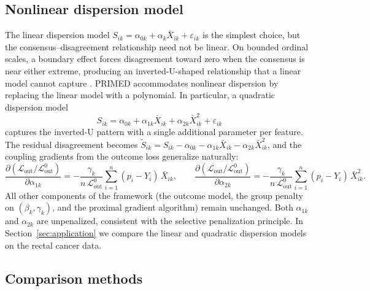 \documentclass[referee,lineno,pdflatex,sn-vancouver-num]{sn-jnl}
\begin{document}
\subsection{Nonlinear dispersion model}\label{sec:nonlinear}

The linear dispersion model $S_{ik} = \alpha_{0k} + \alpha_k \bar X_{ik} + \varepsilon_{ik}$ is the simplest choice, but the consensus--disagreement relationship need not be linear.
On bounded ordinal scales, a boundary effect forces disagreement toward zero when the consensus is near either extreme, producing an inverted-U-shaped relationship that a linear model cannot capture \cite{Taylor1961,Taylor2019}.
PRIMED accommodates nonlinear dispersion by replacing the linear model with a polynomial.
In particular, a quadratic dispersion model
\begin{equation}\label{eq:quad_disp}
  S_{ik} = \alpha_{0k} + \alpha_{1k} \bar X_{ik} + \alpha_{2k} \bar X_{ik}^2 + \varepsilon_{ik}
\end{equation}
captures the inverted-U pattern with a single additional parameter per feature.
The residual disagreement becomes $\tilde S_{ik} = S_{ik} - \alpha_{0k} - \alpha_{1k} \bar X_{ik} - \alpha_{2k} \bar X_{ik}^2$, and the coupling gradients from the outcome loss generalize naturally:
\[
  \frac{\partial (\mathcal{L}_{\mathrm{out}}/\mathcal{L}_{\mathrm{out}}^0)}{\partial \alpha_{1k}}
  = -\frac{\gamma_k}{n\,\mathcal{L}_{\mathrm{out}}^0} \sum_{i=1}^n (p_i - Y_i)\,\bar X_{ik}, \qquad
  \frac{\partial (\mathcal{L}_{\mathrm{out}}/\mathcal{L}_{\mathrm{out}}^0)}{\partial \alpha_{2k}}
  = -\frac{\gamma_k}{n\,\mathcal{L}_{\mathrm{out}}^0} \sum_{i=1}^n (p_i - Y_i)\,\bar X_{ik}^2.
\]
All other components of the framework (the outcome model, the group penalty on $(\beta_k, \gamma_k)$, and the proximal gradient algorithm) remain unchanged.
Both $\alpha_{1k}$ and $\alpha_{2k}$ are unpenalized, consistent with the selective penalization principle.
In Section~\ref{sec:application} we compare the linear and quadratic dispersion models on the rectal cancer data.

\subsection{Comparison methods}\label{sec:comparison}
\end{document}
